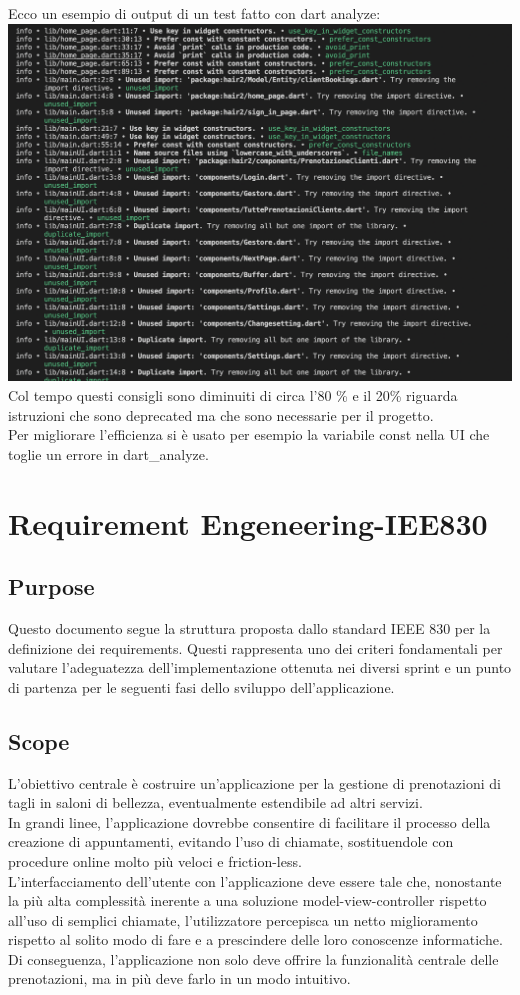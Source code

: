 \documentclass{article}
\begin{document}
Ecco un esempio di output di un test fatto con dart analyze:
\\\includegraphics[scale = 0.5]{"Immagini/Dart_analyze.png"}
\\Col tempo questi consigli sono diminuiti di circa l'80 \% e il 20\% riguarda istruzioni
che sono deprecated ma che sono necessarie per il progetto.
\\Per migliorare l'efficienza si è usato per esempio la variabile const nella UI che toglie un errore in dart\_analyze.

\newpage
\section{Requirement Engeneering-IEE830}
\subsection{Purpose} 
Questo documento segue la struttura proposta dallo standard IEEE 830 per la definizione dei requirements. Questi rappresenta uno dei criteri fondamentali per valutare l’adeguatezza dell’implementazione ottenuta nei diversi sprint e un punto di partenza per le seguenti fasi dello sviluppo dell’applicazione.
\subsection{Scope}
L’obiettivo centrale è costruire un’applicazione per la gestione di prenotazioni di tagli in saloni di bellezza, eventualmente estendibile ad altri servizi. 
\\In grandi linee, l’applicazione dovrebbe consentire di facilitare il processo della creazione di appuntamenti, evitando l’uso di chiamate, sostituendole con procedure online molto più veloci e friction-less. 
\\L’interfacciamento dell’utente con l’applicazione deve essere tale che, nonostante la più alta complessità inerente a una soluzione model-view-controller rispetto all’uso di semplici chiamate, l’utilizzatore percepisca un netto miglioramento rispetto al solito modo di fare e a prescindere delle loro conoscenze informatiche. 
\\Di conseguenza, l’applicazione non solo deve offrire la funzionalità centrale delle prenotazioni, ma in più deve farlo in un modo intuitivo. 
\end{document}
